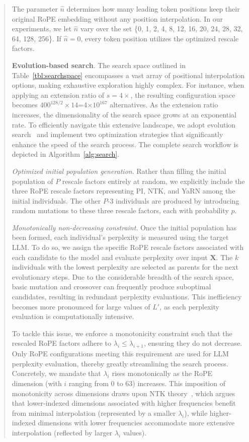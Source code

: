 \begin{abstract}
The parameter $\hat{n}$ determines how many leading token positions keep their original RoPE embedding without any position interpolation. In our experiments, we let $\hat{n}$ vary over the set \{0, 1, 2, 4, 8, 12, 16, 20, 24, 28, 32, 64, 128, 256\}. If $\hat{n}=0$, every token position utilizes the optimized rescale factors.

\textbf{Evolution-based search}. The search space outlined in Table~\ref{tbl:searchspace} encompasses a vast array of positional interpolation options, making exhaustive exploration highly complex. For instance, when applying an extension ratio of $s=4\times$, the resulting configuration space becomes $400^{128/2}\times14$=4$\times10^{167}$ alternatives. As the extension ratio increases, the dimensionality of the search space grows at an exponential rate. To efficiently navigate this extensive landscape, we adopt evolution search~\cite{guo2020single} and implement two optimization strategies that significantly enhance the speed of the search process. The complete search workflow is depicted in Algorithm~\ref{alg:search}.

\textit{Optimized initial population generation}. Rather than filling the initial population of $P$ rescale factors entirely at random, we explicitly include the three RoPE rescale factors representing PI, NTK, and YaRN among the initial individuals. The other $P$-3 individuals are produced by introducing random mutations to these three rescale factors, each with probability $p$.

\textit{Monotonically non-decreasing constraint}. Once the initial population has been formed, each individual's perplexity is measured using the target LLM. To do so, we assign the specific RoPE rescale factors associated with each candidate to the model and evaluate perplexity over input $\mathbf{X}$. The $k$ individuals with the lowest perplexity are selected as parents for the next evolutionary steps. Due to the considerable breadth of the search space, basic mutation and crossover can frequently produce suboptimal candidates, resulting in redundant perplexity evaluations. This inefficiency becomes more pronounced for large values of $L'$, as each perplexity evaluation is computationally intensive.

To tackle this issue, we enforce a monotonicity constraint such that the rescaled RoPE factors adhere to $\lambda_i \le \lambda_{i+1}$, ensuring they do not decrease. Only RoPE configurations meeting this requirement are used for LLM perplexity evaluation, thereby greatly streamlining the search process. Concretely, we mandate that $\lambda_i$ rises monotonically as the RoPE dimension (with $i$ ranging from 0 to 63) increases. This imposition of monotonicity across dimensions draws upon NTK theory~\cite{jacot2018neural,tancik2020fourier,ntk}, which argues that lower-indexed dimensions associated with higher frequencies benefit from minimal interpolation (represented by a smaller $\lambda_i$), while higher-indexed dimensions with lower frequencies accommodate more extensive interpolation (reflected by larger $\lambda_i$ values).


\end{abstract}
